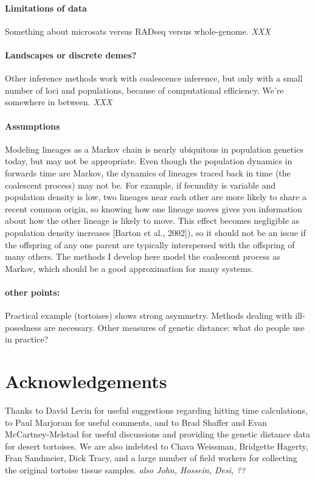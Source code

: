 \documentclass{article}
\newcommand{\plr}[1]{{\em \color{blue} #1}}
\begin{document}
\paragraph{Limitations of data}
Something about microsats versus RADseq versus whole-genome.
\plr{XXX}

\paragraph{Landscapes or discrete demes?}
Other inference methods \citep{wilson2003bayesian,beerli1999maximum,beerli2010unified,hey2007integration}
work with coalescence inference, but only with a small number of loci and populations,
because of computational efficiency.
We're somewhere in between.
\plr{XXX}


\paragraph{Assumptions}
Modeling lineages as a Markov chain is nearly ubiquitous in population genetics today,
but may not be appropriate.
Even though the population dynamics in forwards time are Markov, the dynamics of lineages traced back
in time (the coalescent process) may not be. For example, if fecundity is variable and population density
is low, two lineages near each other are more likely to share a recent common origin, so knowing how one
lineage moves gives you information about how the other lineage is likely to move. This effect becomes
negligible as population density increases [Barton et al., 2002]), so it should not be an issue if the offspring
of any one parent are typically interspersed with the offspring of many others. The methods I develop here
model the coalescent process as Markov, which should be a good approximation for many systems.

\paragraph{other points:}
Practical example (tortoises) shows strong asymmetry.
Methods dealing with ill-posedness are necessary.
Other measures of genetic distance: what do people use in practice?


\section*{Acknowledgements}

Thanks to David Levin for useful suggestions regarding hitting time calculations,
to Paul Marjoram for useful comments,
and to Brad Shaffer and Evan McCartney-Melstad for useful discussions
and providing the genetic distance data for desert tortoises.
We are also indebted to Chava Weissman, Bridgette Hagerty, Fran Sandmeier, Dick Tracy,
and a large number of field workers for collecting the original tortoise tissue samples.
\plr{also John, Hossein, Desi, ??}
\end{document}
